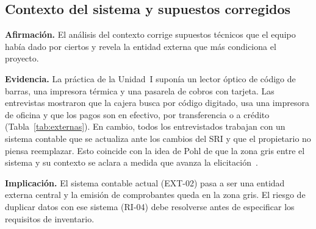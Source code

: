 \subsection{Contexto del sistema y supuestos corregidos}

\textbf{Afirmación.} El análisis del contexto corrige supuestos técnicos que el equipo había dado por ciertos y revela la entidad externa que más condiciona el proyecto.

\textbf{Evidencia.} La práctica de la Unidad~I suponía un lector óptico de código de barras, una impresora térmica y una pasarela de cobros con tarjeta. Las entrevistas mostraron que la cajera busca por código digitado, usa una impresora de oficina y que los pagos son en efectivo, por transferencia o a crédito (Tabla~\ref{tab:externas}). En cambio, todos los entrevistados trabajan con un sistema contable que se actualiza ante los cambios del SRI y que el propietario no piensa reemplazar. Esto coincide con la idea de Pohl de que la zona gris entre el sistema y su contexto se aclara a medida que avanza la elicitación~\cite{pohl2025}.

\textbf{Implicación.} El sistema contable actual (EXT-02) pasa a ser una entidad externa central y la emisión de comprobantes queda en la zona gris. El riesgo de duplicar datos con ese sistema (RI-04) debe resolverse antes de especificar los requisitos de inventario.
